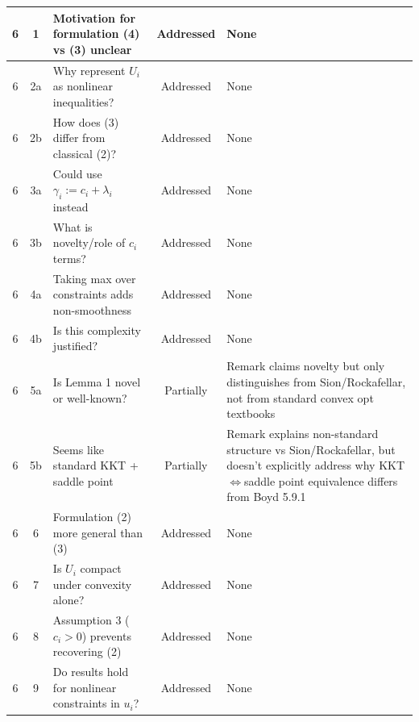 \documentclass[journal,twoside,web]{ieeecolor}
\begin{document}
\begin{longtable}{|c|c|p{5.5cm}|c|p{3.5cm}|}
6 & 1 & Motivation for formulation (4) vs (3) unclear & Addressed & None \\
\hline
6 & 2a & Why represent $U_i$ as nonlinear inequalities? & Addressed & None \\
\hline
6 & 2b & How does (3) differ from classical (2)? & Addressed & None \\
\hline
6 & 3a & Could use $\gamma_i := c_i + \lambda_i$ instead & Addressed & None \\
\hline
6 & 3b & What is novelty/role of $c_i$ terms? & Addressed & None \\
\hline
6 & 4a & Taking max over constraints adds non-smoothness & Addressed & None \\
\hline
6 & 4b & Is this complexity justified? & Addressed & None \\
\hline
6 & 5a & Is Lemma 1 novel or well-known? & Partially & Remark claims novelty but only distinguishes from Sion/Rockafellar, not from standard convex opt textbooks \\
\hline
6 & 5b & Seems like standard KKT + saddle point & Partially & Remark explains non-standard structure vs Sion/Rockafellar, but doesn't explicitly address why KKT$\Leftrightarrow$saddle point equivalence differs from Boyd 5.9.1 \\
\hline
6 & 6 & Formulation (2) more general than (3) & Addressed & None \\
\hline
6 & 7 & Is $U_i$ compact under convexity alone? & Addressed & None \\
\hline
6 & 8 & Assumption 3 ($c_i>0$) prevents recovering (2) & Addressed & None \\
\hline
6 & 9 & Do results hold for nonlinear constraints in $u_i$? & Addressed & None \\
\hline


\end{longtable}
\end{document}
